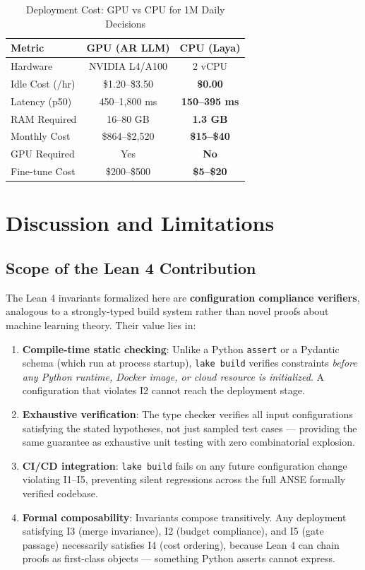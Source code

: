 \documentclass[10pt,journal,compsoc]{IEEEtran}
\theoremstyle{remark}
\begin{document}
\begin{table}[htbp]
\caption{Deployment Cost: GPU vs CPU for 1M Daily Decisions}
\label{tab:cost_comparison}
\centering
\begin{tabular}{lcc}
\toprule
\textbf{Metric} & \textbf{GPU (AR LLM)} & \textbf{CPU (Laya)} \\
\midrule
Hardware         & NVIDIA L4/A100 & 2 vCPU \\
Idle Cost (/hr)  & \$1.20--\$3.50 & \textbf{\$0.00} \\
Latency (p50)    & 450--1,800 ms  & \textbf{150--395 ms} \\
RAM Required     & 16--80 GB      & \textbf{1.3 GB} \\
Monthly Cost     & \$864--\$2,520 & \textbf{\$15--\$40} \\
GPU Required     & Yes            & \textbf{No} \\
Fine-tune Cost   & \$200--\$500   & \textbf{\$5--\$20} \\
\bottomrule
\end{tabular}
\end{table}

\section{Discussion and Limitations}

\subsection{Scope of the Lean 4 Contribution}

The Lean 4 invariants formalized here are \textbf{configuration compliance verifiers}, analogous to a strongly-typed build system rather than novel proofs about machine learning theory. Their value lies in:
\begin{enumerate}
\item \textbf{Compile-time static checking}: Unlike a Python \texttt{assert} or a Pydantic schema (which run at process startup), \texttt{lake build} verifies constraints \emph{before any Python runtime, Docker image, or cloud resource is initialized}. A configuration that violates I2 cannot reach the deployment stage.
\item \textbf{Exhaustive verification}: The type checker verifies all input configurations satisfying the stated hypotheses, not just sampled test cases --- providing the same guarantee as exhaustive unit testing with zero combinatorial explosion.
\item \textbf{CI/CD integration}: \texttt{lake build} fails on any future configuration change violating I1--I5, preventing silent regressions across the full ANSE formally verified codebase.
\item \textbf{Formal composability}: Invariants compose transitively. Any deployment satisfying I3 (merge invariance), I2 (budget compliance), and I5 (gate passage) necessarily satisfies I4 (cost ordering), because Lean 4 can chain proofs as first-class objects --- something Python asserts cannot express.
\end{enumerate}
\end{document}
